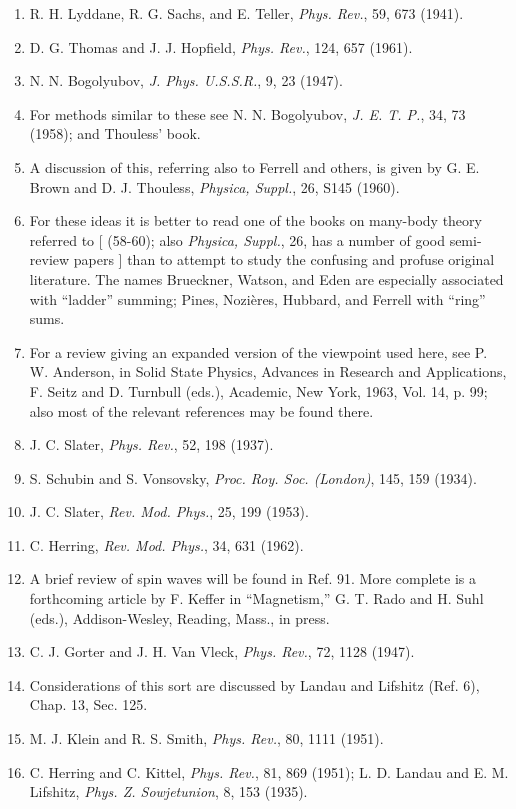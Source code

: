 \begin{enumerate}[label=(\arabic*),leftmargin=2.8em,itemsep=1pt,parsep=0pt]
\item R. H. Lyddane, R. G. Sachs, and E. Teller, \emph{Phys. Rev.}, 59, 673 (1941).
\item D. G. Thomas and J. J. Hopfield, \emph{Phys. Rev.}, 124, 657 (1961).
\item N. N. Bogolyubov, \emph{J. Phys. U.S.S.R.}, 9, 23 (1947).
\item For methods similar to these see N. N. Bogolyubov, \emph{J. E. T. P.}, 34, 73 (1958); and Thouless' book.
\item A discussion of this, referring also to Ferrell and others, is given by G. E. Brown and D. J. Thouless, \emph{Physica, Suppl.}, 26, S145 (1960).
\item For these ideas it is better to read one of the books on many-body theory referred to [ (58-60); also \emph{Physica, Suppl.}, 26, has a number of good semi-review papers ] than to attempt to study the confusing and profuse original literature. The names Brueckner, Watson, and Eden are especially associated with ``ladder'' summing; Pines, Nozi\`eres, Hubbard, and Ferrell with ``ring'' sums.
\item For a review giving an expanded version of the viewpoint used here, see P. W. Anderson, in Solid State Physics, Advances in Research and Applications, F. Seitz and D. Turnbull (eds.), Academic, New York, 1963, Vol. 14, p. 99; also most of the relevant references may be found there.
\item J. C. Slater, \emph{Phys. Rev.}, 52, 198 (1937).
\item S. Schubin and S. Vonsovsky, \emph{Proc. Roy. Soc. (London)}, 145, 159 (1934).
\item J. C. Slater, \emph{Rev. Mod. Phys.}, 25, 199 (1953).
\item C. Herring, \emph{Rev. Mod. Phys.}, 34, 631 (1962).
\item A brief review of spin waves will be found in Ref. 91. More complete is a forthcoming article by F. Keffer in ``Magnetism,'' G. T. Rado and H. Suhl (eds.), Addison-Wesley, Reading, Mass., in press.
\item C. J. Gorter and J. H. Van Vleck, \emph{Phys. Rev.}, 72, 1128 (1947).
\item Considerations of this sort are discussed by Landau and Lifshitz (Ref. 6), Chap. 13, Sec. 125.
\item M. J. Klein and R. S. Smith, \emph{Phys. Rev.}, 80, 1111 (1951).
\item C. Herring and C. Kittel, \emph{Phys. Rev.}, 81, 869 (1951); L. D. Landau and E. M. Lifshitz, \emph{Phys. Z. Sowjetunion}, 8, 153 (1935).

\end{enumerate}
